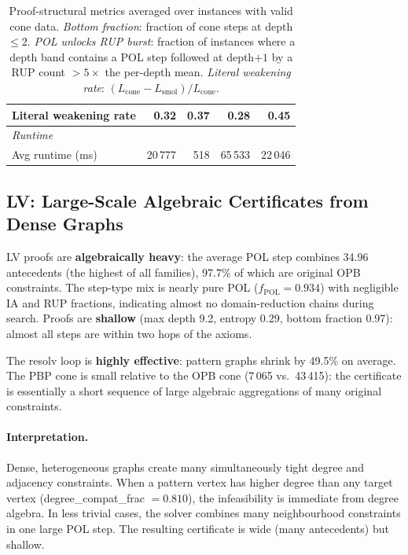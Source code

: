 \documentclass[11pt,a4paper]{article}
\begin{document}
\begin{table}[h]
\begin{tabular}{lrrrr}
\quad Literal weakening rate &  0.32  &  0.37  &  0.28   &  0.45   \\
\midrule
\multicolumn{5}{l}{\emph{Runtime}} \\
\quad Avg runtime (ms)   & 20\,777 & 518 & 65\,533 & 22\,046 \\
\bottomrule
\end{tabular}
\caption{Proof-structural metrics averaged over instances with valid cone data.
\emph{Bottom fraction}: fraction of cone steps at depth $\le 2$.
\emph{POL unlocks RUP burst}: fraction of instances where a depth band contains a POL step
followed at depth$+1$ by a RUP count $>5\times$ the per-depth mean.
\emph{Literal weakening rate}: $(L_{\mathrm{cone}} - L_{\mathrm{smol}}) / L_{\mathrm{cone}}$.}
\label{tab:proof-features}
\end{table}

\subsection{LV: Large-Scale Algebraic Certificates from Dense Graphs}
\label{sec:fingerprint-lv}

LV proofs are \textbf{algebraically heavy}: the average POL step combines 34.96 antecedents
(the highest of all families), 97.7\% of which are original OPB constraints.
The step-type mix is nearly pure POL ($f_{\mathrm{POL}} = 0.934$) with negligible IA
and RUP fractions, indicating almost no domain-reduction chains during search.
Proofs are \textbf{shallow} (max depth 9.2, entropy 0.29, bottom fraction 0.97): almost all steps
are within two hops of the axioms.

The resolv loop is \textbf{highly effective}: pattern graphs shrink by 49.5\% on average.
The PBP cone is small relative to the OPB cone (7\,065 vs.\ 43\,415): the certificate is
essentially a short sequence of large algebraic aggregations of many original constraints.

\paragraph{Interpretation.} Dense, heterogeneous graphs create many simultaneously tight degree
and adjacency constraints.
When a pattern vertex has higher degree than any target vertex
(degree\_compat\_frac $= 0.810$), the infeasibility is immediate from degree algebra.
In less trivial cases, the solver combines many neighbourhood constraints in one large POL step.
The resulting certificate is wide (many antecedents) but shallow.
\end{document}
